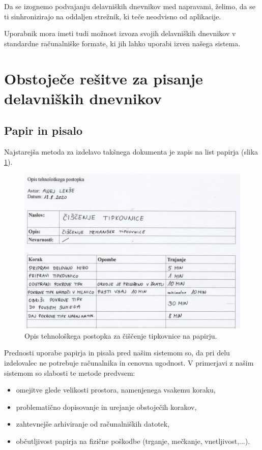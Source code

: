\documentclass[a4paper, 12pt]{book}
\begin{document}
Da se izognemo podvajanju delavniških dnevnikov med napravami, želimo, da se ti sinhronizirajo na oddaljen strežnik, ki teče neodvisno od aplikacije.

Uporabnik mora imeti tudi možnost izvoza svojih delavniških dnevnikov v standardne računalniške formate, ki jih lahko uporabi izven našega sistema.




\section{Obstoječe rešitve za pisanje delavniških dnevnikov}

\subsection{Papir in pisalo}

Najstarejša metoda za izdelavo takšnega dokumenta je zapis na list papirja (slika \ref{paper}).

\begin{figure}[H]
\begin{center}
\includegraphics[width=13.5cm]{report_paper_small}
\end{center}
\caption{Opis tehnološkega postopka za čiščenje tipkovnice na papirju.}
\label{paper}
\end{figure}


Prednosti uporabe papirja in pisala pred našim sistemom so, da pri delu izdelovalec ne potrebuje računalnika in cenovna ugodnost.
V primerjavi z našim sistemom so slabosti te metode predvsem:
\begin{itemize}
	\item omejitve glede velikosti prostora, namenjenega vsakemu koraku,
	\item problematično dopisovanje in urejanje obstoječih korakov,
	\item zahtevnejše arhiviranje od računalniških datotek,
	\item občutljivost papirja na fizične poškodbe (trganje, mečkanje, vnetljivost,...).
\end{itemize}
\end{document}

